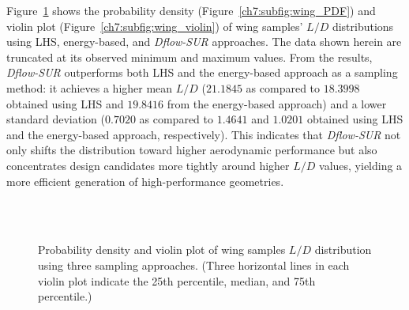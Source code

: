 Figure~\ref{ch7:fig:wingPerformance} shows the probability density (Figure~\ref{ch7:subfig:wing_PDF}) and violin plot (Figure~\ref{ch7:subfig:wing_violin}) of wing samples' $L/D$ distributions using LHS, energy-based, and \textit{Dflow-SUR} approaches. The data shown herein are truncated at its observed minimum and maximum values. From the results, \textit{Dflow-SUR} outperforms both LHS and the energy-based approach as a sampling method: it achieves a higher mean $L/D$ ($21.1845$ as compared to $18.3998$ obtained using LHS and $19.8416$ from the energy-based approach) and a lower standard deviation ($0.7020$ as compared to $1.4641$ and $1.0201$ obtained using LHS and the energy-based approach, respectively). This indicates that \textit{Dflow-SUR} not only shifts the distribution toward higher aerodynamic performance but also concentrates design candidates more tightly around higher $L/D$ values, yielding a more efficient generation of high-performance geometries.
\begin{figure}[ht!]
    \centering
    \\[1em]
    \\[1em]

    \caption{Probability density and violin plot of wing samples $L/D$ distribution using three sampling approaches. (Three horizontal lines in each violin plot indicate the 25th percentile, median, and 75th percentile.)}
    \label{ch7:fig:wingPerformance}
\end{figure}

